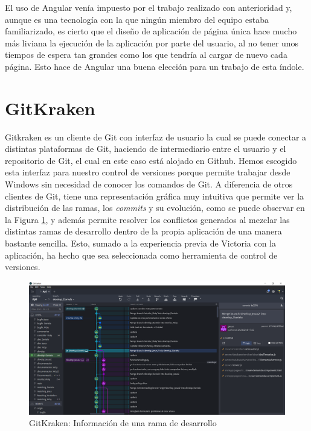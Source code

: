\documentclass[11pt]{book}
\begin{document}
	
	El uso de Angular venía impuesto por el trabajo realizado con anterioridad y, aunque es una tecnología con la que ningún miembro del equipo estaba familiarizado, es cierto que el diseño de aplicación de página única hace mucho más liviana la ejecución de la aplicación por parte del usuario, al no tener unos tiempos de espera tan grandes como los que tendría al cargar de nuevo cada página. Esto hace de Angular una buena elección para un trabajo de esta índole.
	
	\section{GitKraken}
	Gitkraken es un cliente de Git con interfaz de usuario la cual se puede conectar a distintas plataformas de Git, haciendo de intermediario entre el usuario y el repositorio de Git, el cual en este caso está alojado en Github. Hemos escogido esta interfaz para nuestro control de versiones porque permite trabajar desde Windows sin necesidad de conocer los comandos de Git. A diferencia de otros clientes de Git, tiene una representación gráfica muy intuitiva que permite ver la distribución de las ramas, los \emph{commits} y su evolución, como se puede observar en la Figura \ref{Figura 1}, y además permite resolver los conflictos generados al mezclar las distintas ramas de desarrollo dentro de la propia aplicación de una manera bastante sencilla. Esto, sumado a la experiencia previa de Victoria con la aplicación, ha hecho que sea seleccionada como herramienta de control de versiones.
	\begin{figure}
		\centering
		\includegraphics[scale=0.4]{gitkraken}
		\caption{GitKraken: Información de una rama de desarrollo}
		\label{Figura 1}
	\end{figure}
	
\end{document}

